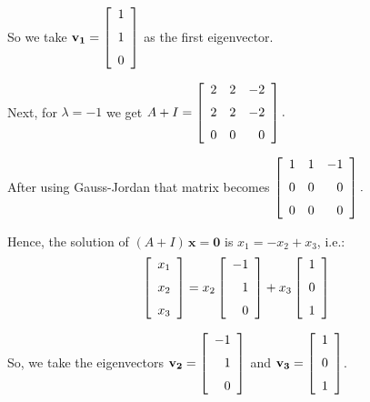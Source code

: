 \documentclass[12pt]{article}
\begin{document}
{So we take 
$\displaystyle{\mathbf{v_1} = 
\left [
\begin {array}{r} 1\\\noalign{\medskip}1\\\noalign{\medskip}0
\end {array}\right ]}$
as the first eigenvector.

Next, for $\lambda = -1$ we get
$\displaystyle{
A + I = 
\left [\begin {array}{rrr} 2&2&-2\\\noalign{\medskip}2&2&-2
\\\noalign{\medskip}0&0&0\end {array}\right ].
}$

After using Gauss-Jordan that matrix becomes 
$\displaystyle{
\left [\begin {array}{rrr} 1&1&-1\\\noalign{\medskip}0&0&0
\\\noalign{\medskip}0&0&0\end {array}\right ].
}$

Hence, the solution of $(A+I)\,\mathbf{x} = \mathbf{0}$ is 
$x_1 = -x_2+x_3$, i.e.:
\[
\left [\begin {array}{r} x_{{1}}\\\noalign{\medskip}x_{{2}}
\\\noalign{\medskip}x_{{3}}\end {array}\right ]=x_{{2}}\left [
\begin {array}{r} -1\\\noalign{\medskip}1\\\noalign{\medskip}0
\end {array}\right ]+x_{{3}}\left [\begin {array}{r} 1
\\\noalign{\medskip}0\\\noalign{\medskip}1\end {array}\right ]
\]

So, we take the eigenvectors 
$\displaystyle{\mathbf{v_2} = 
\left [
\begin {array}{r} -1\\\noalign{\medskip}1\\\noalign{\medskip}0
\end {array}\right ]}$
and
$\displaystyle{\mathbf{v_3} = 
\left [
\begin {array}{r} 1\\\noalign{\medskip}0\\\noalign{\medskip}1
\end {array}\right ]}$.

}
\end{document}
